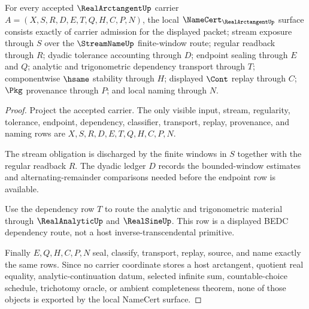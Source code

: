 \begin{theorem}
\label{thm:real-arctangent-namecert-obligations}
For every accepted $\RealArctangentUp$ carrier $A=(X,S,R,D,E,T,Q,H,C,P,N)$, the local $\NameCert_{\RealArctangentUp}$ surface consists exactly of carrier admission for the displayed packet; stream exposure through $S$ over the $\StreamNameUp$ finite-window route; regular readback through $R$; dyadic tolerance accounting through $D$; endpoint sealing through $E$ and $Q$; analytic and trigonometric dependency transport through $T$; componentwise $\hsame$ stability through $H$; displayed $\Cont$ replay through $C$; $\Pkg$ provenance through $P$; and local naming through $N$.
\end{theorem}
\begin{proof}
Project the accepted carrier. The only visible input, stream, regularity, tolerance, endpoint, dependency, classifier, transport, replay, provenance, and naming rows are $X,S,R,D,E,T,Q,H,C,P,N$.

The stream obligation is discharged by the finite windows in $S$ together with the regular readback $R$. The dyadic ledger $D$ records the bounded-window estimates and alternating-remainder comparisons needed before the endpoint row is available.

Use the dependency row $T$ to route the analytic and trigonometric material through $\RealAnalyticUp$ and $\RealSineUp$. This row is a displayed BEDC dependency route, not a host inverse-transcendental primitive.

Finally $E,Q,H,C,P,N$ seal, classify, transport, replay, source, and name exactly the same rows. Since no carrier coordinate stores a host arctangent, quotient real equality, analytic-continuation datum, selected infinite sum, countable-choice schedule, trichotomy oracle, or ambient completeness theorem, none of those objects is exported by the local NameCert surface.
\end{proof}

